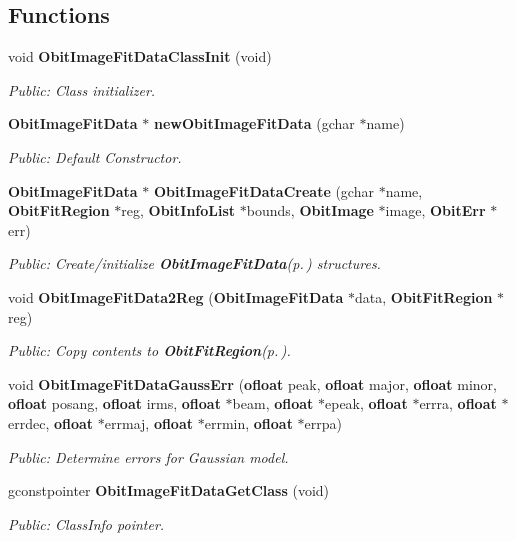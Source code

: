 \subsection*{Functions}
\begin{CompactItemize}
\item 
void {\bf Obit\-Image\-Fit\-Data\-Class\-Init} (void)
\begin{CompactList}\small\item\em Public: Class initializer. \item\end{CompactList}\item 
{\bf Obit\-Image\-Fit\-Data} $\ast$ {\bf new\-Obit\-Image\-Fit\-Data} (gchar $\ast$name)
\begin{CompactList}\small\item\em Public: Default Constructor. \item\end{CompactList}\item 
{\bf Obit\-Image\-Fit\-Data} $\ast$ {\bf Obit\-Image\-Fit\-Data\-Create} (gchar $\ast$name, {\bf Obit\-Fit\-Region} $\ast$reg, {\bf Obit\-Info\-List} $\ast$bounds, {\bf Obit\-Image} $\ast$image, {\bf Obit\-Err} $\ast$err)
\begin{CompactList}\small\item\em Public: Create/initialize {\bf Obit\-Image\-Fit\-Data}{\rm (p.\,\pageref{structObitImageFitData})} structures. \item\end{CompactList}\item 
void {\bf Obit\-Image\-Fit\-Data2Reg} ({\bf Obit\-Image\-Fit\-Data} $\ast$data, {\bf Obit\-Fit\-Region} $\ast$reg)
\begin{CompactList}\small\item\em Public: Copy contents to {\bf Obit\-Fit\-Region}{\rm (p.\,\pageref{structObitFitRegion})}. \item\end{CompactList}\item 
void {\bf Obit\-Image\-Fit\-Data\-Gauss\-Err} ({\bf ofloat} peak, {\bf ofloat} major, {\bf ofloat} minor, {\bf ofloat} posang, {\bf ofloat} irms, {\bf ofloat} $\ast$beam, {\bf ofloat} $\ast$epeak, {\bf ofloat} $\ast$errra, {\bf ofloat} $\ast$errdec, {\bf ofloat} $\ast$errmaj, {\bf ofloat} $\ast$errmin, {\bf ofloat} $\ast$errpa)
\begin{CompactList}\small\item\em Public: Determine errors for Gaussian model. \item\end{CompactList}\item 
gconstpointer {\bf Obit\-Image\-Fit\-Data\-Get\-Class} (void)
\begin{CompactList}\small\item\em Public: Class\-Info pointer. \item\end{CompactList}\end{CompactItemize}


